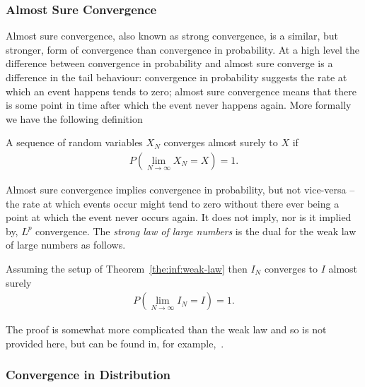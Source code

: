 \subsubsection{Almost Sure Convergence}
\label{sec:inf:mc:conv:as}

Almost sure convergence, also known as strong convergence, is a similar, but stronger, form of convergence than convergence in
probability.  At a high level the difference between
convergence in probability and almost sure converge is a difference in the tail behaviour:
convergence in probability suggests the rate at which an event happens tends to zero; almost
sure convergence means that there is some point in time after which the event never happens
again.  More formally we have the following definition
\begin{definition}
A sequence of random variables $X_N$ converges almost surely to $X$ if
\begin{align}
	P\left(\lim\limits_{N\rightarrow\infty} X_N=X\right)=1.
\end{align}
\end{definition}
\noindent Almost sure convergence implies convergence in probability, but not vice-versa -- the rate
at which events occur might tend to zero without there ever being a point at which the
event never occurs again.  It does not imply, nor is it implied by, $L^p$ convergence.
The \emph{strong law of large numbers} is the dual for the weak law of large numbers as
follows.
\begin{theorem}
	Assuming the setup of Theorem~\ref{the:inf:weak-law} then $I_N$ converges to $I$ almost surely
	\begin{align}
	P\left(\lim\limits_{N\rightarrow\infty} I_N=I\right)=1.
	\end{align}
\end{theorem}
The proof is somewhat more complicated than the weak law and so is not provided here, but can
be found in, for example,~\cite[Theorem 2.4.1]{durrett2010probability}.

\subsubsection{Convergence in Distribution}
\label{sec:inf:mc:conv:dist}

